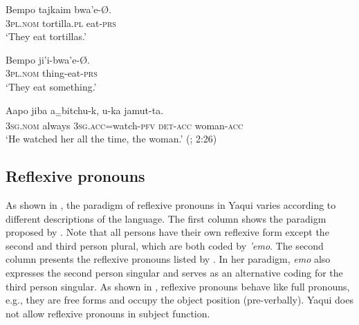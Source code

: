 \documentclass[output=paper]{langscibook}
\begin{document}
\ea%
    \label{ex:guerrero:7}

\ea
\label{ex:guerrero:7a}
\gll Bempo   tajkaim   bwa’e-Ø.\\
  \textsc{3pl.nom}  tortilla.\textsc{pl}  eat-\textsc{prs}\\
\glt ‘They eat tortillas.’

\ex
\label{ex:guerrero:7b}
\gll Bempo   ji’i-bwa’e-Ø.\\
  \textsc{3pl.nom}  thing-eat-\textsc{prs}\\
\glt ‘They eat something.’

\ex
\label{ex:guerrero:7c}
\gll Aapo  jiba    a\textsubscript{=}bitchu-k,  u-ka  jamut-ta.\\
    \textsc{3sg.nom}  always   \textsc{3sg.acc}=watch-\textsc{pfv}  \textsc{det-acc}  woman-\textsc{acc}\\
   \glt   ‘He watched her all the time, the woman.’  (\citealt{SilvaEtAl1998}; 2:26)
\z
\z



\subsection{Reflexive pronouns}\label{sec:guerrero:2.2}


As shown in , the paradigm of reflexive pronouns in Yaqui varies according to different descriptions of the language. The first column shows the paradigm proposed by \citet[246]{DedrickCasad1999}. Note that all persons have their own reflexive form except the second and third person plural, which are both coded by \textit{’emo}. The second column presents the reflexive pronouns listed by \citet[32]{Estrada2009}. In her paradigm, \textit{emo} also expresses the second person singular and serves as an alternative coding for the third person singular. As shown in , reflexive pronouns behave like full pronouns, e.g., they are free forms and occupy the object position (pre-verbally). Yaqui does not allow reflexive pronouns in subject function.
\end{document}
